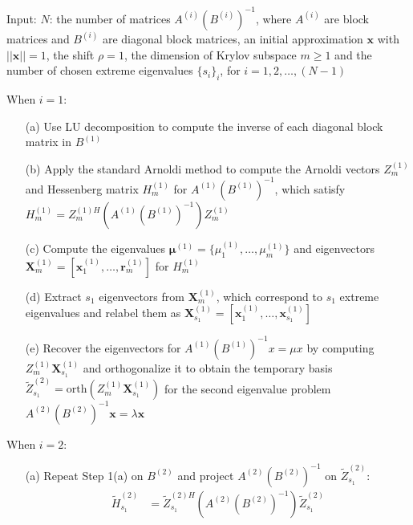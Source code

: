 \begin{algorithm}[H]
    \SetAlgoLined
    Input: $N$: the number of matrices $A^{(i)}\left(B^{(i)}\right)^{-1}$, where $A^{(i)}$ are block matrices and $B^{(i)}$ are diagonal block matrices, an initial approximation $\boldsymbol{x}$ with $||\boldsymbol{x}|| = 1$, the shift $\rho = 1$, the dimension of Krylov subspace $m\geq 1$ and the number of chosen extreme eigenvalues $\{s_{i}\}_{i}$, for $i = 1, 2, \dots, (N-1)$\\
    \vspace{0.5cm}
    \begin{algorithmic}[1]
        \STATE When $i = 1$:
        \begin{itemize}
            \item[(a)] Use LU decomposition to compute the inverse of each diagonal block matrix in $B^{(1)}$
            
            \item[(b)]Apply the standard Arnoldi method to compute the Arnoldi vectors $Z_{m}^{(1)}$ and Hessenberg matrix $H_{m}^{(1)}$ for $A^{(1)}\left(B^{(1)}\right)^{-1}$, which satisfy $H_{m}^{(1)} = Z_{m}^{(1)H}\left(A^{(1)}\left(B^{(1)}\right)^{-1}\right)Z_{m}^{(1)}$
    
            \item[(c)] Compute the eigenvalues $\boldsymbol{\mu}^{(1)} = \{\mu_{1}^{(1)}, \dots, \mu_{m}^{(1)}\}$ and eigenvectors $\boldsymbol{X}_{m}^{(1)} = \left[\boldsymbol{x}_{1}^{(1)}, \dots, \boldsymbol{r}_{m}^{(1)}\right]$ for $H_{m}^{(1)}$
            
            \item[(d)] Extract $s_{1}$ eigenvectors from $\boldsymbol{X}_{m}^{(1)}$, which correspond to $s_{1}$ extreme eigenvalues and relabel them as $\boldsymbol{X}_{s_{1}}^{(1)} = \left[\boldsymbol{x}_{1}^{(1)}, \dots, \boldsymbol{x}_{s_{1}}^{(1)}\right]$
            
            \item[(e)] Recover the eigenvectors for $A^{(1)}\left(B^{(1)}\right)^{-1}x = \mu x$ by computing $Z_{m}^{(1)}\boldsymbol{X}_{s_{1}}^{(1)}$ and orthogonalize it to obtain the temporary basis $\tilde{Z}_{s_{1}}^{(2)} = \text{orth}\left(Z_{m}^{(1)}\boldsymbol{X}_{s_{1}}^{(1)}\right)$ for the second eigenvalue problem $A^{(2)}\left(B^{(2)}\right)^{-1}\boldsymbol{x} = \lambda \boldsymbol{x}$
        \end{itemize}
        
        \STATE When $i = 2$:
        \begin{itemize}
            \item[(a)] Repeat Step 1(a) on $B^{(2)}$ and project $A^{(2)}\left(B^{(2)}\right)^{-1}$ on $\tilde{Z}_{s_{1}}^{(2)}$: 
            \begin{align*}
                \tilde{H}_{s_{1}}^{(2)} &= \tilde{Z}_{s_{1}}^{(2)H}\left(A^{(2)}\left(B^{(2)}\right)^{-1}\right) \tilde{Z}_{s_{1}}^{(2)}
            \end{align*}
            

\end{itemize}
\end{algorithmic}
\end{algorithm}
